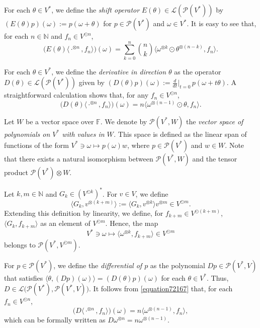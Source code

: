 \documentclass[12pt]{article}
\theoremstyle{remark}
\theoremstyle{remark}
\theoremstyle{remark}
\begin{document}
 For each $\theta \in V^*$, we define the  {\it shift operator} $E(\theta)\in \mathcal L( \mathcal P  (V^*))$ by $(E(\theta)p)(\omega):= p(\omega+\theta)$ for  $p\in \mathcal P  (V^*)$ and $\omega\in V^*$.  It is easy to see that, for each $n\in \mathbb{N}$ and $f_n \in V^{\odot  n}$,
\begin{equation}\label{equation786679}\big(E(\theta)\langle \cdot^{\otimes n},f_n\rangle\big)(\omega)=\sum_{k=0}^n {{n}\choose{k}}\langle \omega^{\otimes k}\odot \theta^{\otimes (n-k)},f_n\rangle.\end{equation}


For each $\theta \in V^*$, we define the {\it derivative in direction $\theta$}  as the operator $D(\theta)\in \mathcal L (\mathcal P  (V^*))$ given  by $(D(\theta)p)(\omega):=\frac{d}{dt}\bigr\rvert_{t = 0}\,p(\omega+t\theta)$. 
A straightforward calculation shows that, for any $f_n\in V^{\odot n}$,
\begin{equation}
\big(D(\theta)\langle \cdot^{\otimes n},f_n\rangle\big)(\omega)=n\langle\omega^{\otimes(n-1)}\odot\theta, f_n\rangle. \label{equation72167}
\end{equation}

Let $W$ be a vector space over $\mathbb F$. We denote by $\mathcal P(V^*,W)$ the {\it vector space of polynomials on $V^*$ with values in $W$.} This space is defined  as the linear span of functions of the form $V^*\ni\omega\mapsto p(\omega) w$, where $p\in\mathcal P(V^*)$
 and $w\in W$. Note that there exists a natural isomorphism between $\mathcal P(V^*,W)$ and the tensor product $\mathcal P(V^*)\otimes W$. 


Let $k,m\in\mathbb N$ and $G_k\in (V^{\odot k})^*$. For  $v\in V$,  we define 
$$\langle G_k,v^{\otimes(k+m)}\rangle:=\langle G_k,v^{\otimes k}\rangle v^{\otimes m}\in V^{\odot m}.$$ 
Extending this definition by linearity, we define, for $f_{k+m}\in V^{\odot(k+m)}$, 
 $\langle G_k,f_{k+m}\rangle$ as an element of $V^{\odot m}$. Hence, the map 
 $$V^*\ni\omega\mapsto \langle\omega^{\otimes k},f_{k+m}\rangle\in V^{\odot m}$$
  belongs to $\mathcal P(V^*,V^{\odot m})$.
 
 

For $p\in \mathcal P  (V^*)$, we define the {\it differential of $p$} as the polynomial $Dp\in\mathcal P(V^*,V)$ that satisfies $\langle \theta,  (D p)(\omega)\rangle =(D(\theta)p)(\omega)$ for each $\theta \in V^*$. Thus, $D\in\mathcal L\big(\mathcal P(V^*), \mathcal P(V^*,V)\big)$.
It follows from \eqref{equation72167} that, for each $f_n\in V^{\odot n}$,
$$\big(D\langle\cdot^{\otimes n},f_n\rangle\big)(\omega)=n\langle\omega^{\otimes (n-1)},f_n\rangle,$$
 which can be formally written as $D\omega^{\otimes n}=n\omega^{\otimes (n-1)}$. 
\end{document}
